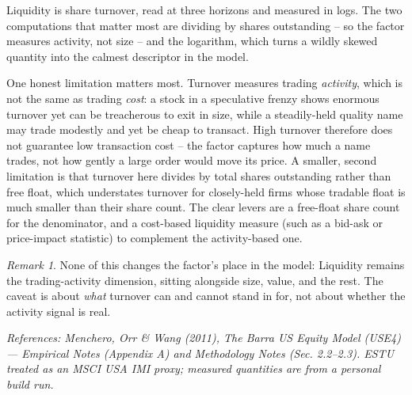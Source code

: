 \documentclass[11pt]{article}
\theoremstyle{definition}
\theoremstyle{plain}
\theoremstyle{remark}
\newtheorem*{remark}{Remark}
\begin{document}
\begin{keyresult}
Liquidity is share turnover, read at three horizons and measured in logs. The two computations that matter most are dividing by shares outstanding -- so the factor measures activity, not size -- and the logarithm, which turns a wildly skewed quantity into the calmest descriptor in the model.
\end{keyresult}

\begin{pitfall}
One honest limitation matters most. Turnover measures trading \emph{activity}, which is not the same as trading \emph{cost}: a stock in a speculative frenzy shows enormous turnover yet can be treacherous to exit in size, while a steadily-held quality name may trade modestly and yet be cheap to transact. High turnover therefore does not guarantee low transaction cost -- the factor captures how much a name trades, not how gently a large order would move its price. A smaller, second limitation is that turnover here divides by total shares outstanding rather than free float, which understates turnover for closely-held firms whose tradable float is much smaller than their share count. The clear levers are a free-float share count for the denominator, and a cost-based liquidity measure (such as a bid-ask or price-impact statistic) to complement the activity-based one.
\end{pitfall}

\begin{remark}
None of this changes the factor's place in the model: Liquidity remains the trading-activity dimension, sitting alongside size, value, and the rest. The caveat is about \emph{what} turnover can and cannot stand in for, not about whether the activity signal is real.
\end{remark}

\begin{center}\small\itshape
References: Menchero, Orr \& Wang (2011), \textit{The Barra US Equity Model (USE4)} --- Empirical Notes (Appendix A) and Methodology Notes (Sec. 2.2--2.3). ESTU treated as an MSCI USA IMI proxy; measured quantities are from a personal build run.
\end{center}
\end{document}
